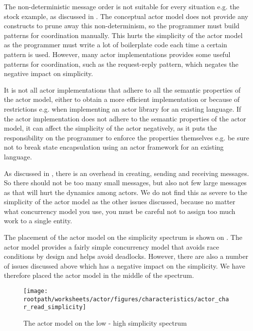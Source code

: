 The non-deterministic message order is not suitable for every situation e.g. the stock example, as discussed in . The conceptual actor model does not provide any constructs to prune away this non-determinism, so the programmer must build patterns for coordination manually. This hurts the simplicity of the actor model as the programmer must write a lot of boilerplate code each time a certain pattern is used. However, many actor implementations provides some useful patterns for coordination, such as the request-reply pattern, which negates the negative impact on simplicity.

It is not all actor implementations that adhere to all the semantic properties of the actor model, either to obtain a more efficient implementation or because of restrictions e.g. when implementing an actor library for an existing language. If the actor implementation does not adhere to the semantic properties of the actor model, it can affect the simplicity of the actor negatively, as it puts the responsibility on the programmer to enforce the properties themselves e.g. be sure not to break state encapsulation using an actor framework for an existing language.

As discussed in , there is an overhead in creating, sending and receiving messages. So there should not be too many small messages, but also not few large messages as that will hurt the dynamics among actors. We do not find this as severe to the simplicity of the actor model as the other issues discussed, because no matter what concurrency model you use, you must be careful not to assign too much work to a single entity.

The placement of the actor model on the simplicity spectrum is shown on . The actor model provides a fairly simple concurrency model that avoids race conditions by design and helps avoid deadlocks. However, there are also a number of issues discussed above which has a negative impact on the simplicity. We have therefore placed the actor model in the middle of the spectrum.

\begin{figure}[htbp]
\centering
 \texttt{[image: \\rootpath/worksheets/actor/figures/characteristics/actor\_char\_read\_simplicity]} 
 \caption{The actor model on the low - high simplicity spectrum}
\label{fig:actor_read_simplicity}
\end{figure}
